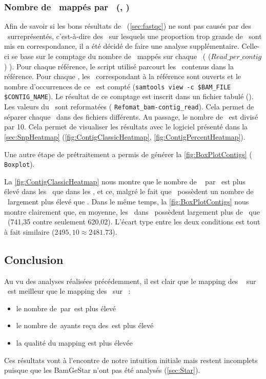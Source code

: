 \documentclass[../main]{subfiles} %
\begin{document}
\subsubsection{Nombre de \reads mappés par \contigs (\BamTrEx, \BamTrMo)}
\label{sec:NbReadsParCotigs}
Afin de savoir si les bons résultats de \TrEx (\cref{sec:fastqc}) ne sont pas causés par des \contigs surreprésentés, c'est-à-dire des \contigs sur lesquels une proportion trop grande de \reads sont mis en correspondance, il a été décidé de faire une analyse supplémentaire. Celle-ci  se base sur le  comptage du nombre de \reads mappés sur chaque \contigs (\cite{florent_f-marchalm1bioinfointernship2024-inrae_agap_ge2pop_2024} ($Read\_per\_contig$) ). Pour chaque référence, le script utilisé parcourt les \contigs contenus dans la référence. Pour chaque  \contig, les \bam correspondant à la référence sont ouverts et le nombre d'occurrences de ce \contig est compté (\lstinline{samtools view -c $BAM_FILE $CONTIG_NAME}). Le résultat de ce comptage est inscrit dans un fichier tabulé (\tsv). Les valeurs du \tsv sont reformatées (\cite{florent_f-marchalm1bioinfointernship2024-inrae_agap_ge2pop_2024} \lstinline{Refomat_bam-contig_read}). Cela permet de séparer chaque \bam dans des fichiers différents. Au passage, le nombre de \reads est divisé par 10. Cela permet de visualiser les résultats avec le logiciel présenté dans la \cref{sec:SnpHeatmap} (\cref{fig:ContigClassicHeatmap}, \cref{fig:ContigPercentHeatmap}).

Une autre étape de prétraitement a permis de générer la \cref{fig:BoxPlotContigs} (\cite{florent_f-marchalm1bioinfointernship2024-inrae_agap_ge2pop_2024} \lstinline{Boxplot}).

La \cref{fig:ContigClassicHeatmap} nous montre que le nombre de \reads  par \contigs est plus élevé dans les \BamTrEx que dans les \BamTrMo, et ce, malgré le fait que \TrMo possèdent un nombre de \contigs largement plus élevé que \TrEx. Dans le même temps, la \cref{fig:BoxPlotContigs} nous montre clairement que, en moyenne, les \contig dans \BamTrEx possèdent largement plus de \reads que \BamTrMo (741,35 contre seulement 620,02). L'écart type entre les deux conditions est tout à fait similaire ($2495,10 \approx 2481.73$).





\subsection{Conclusion}
\label{sec:MapConclusion}
Au vu des analyses réalisées précédemment, il est clair que le \gls{mapping} des \fastq  sur \TrEx est meilleur que le \gls{mapping} des \fastq sur \TrMo :
\begin{itemize}
    \item le nombre de \reads\,par \contigs\,est plus élevé 
    \item le nombre de \contigs\,ayants reçu des \reads\,est plus élevé 
    \item la qualité du \gls{mapping} est plus élevée
\end{itemize}

Ces résultats vont à l'encontre de notre intuition initiale mais restent incomplets puisque que les \acrshort{BamGeStar} n'ont pas été analysés (\cref{sec:Star}).

\end{document}
